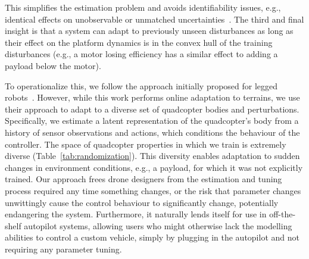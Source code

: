 %
This simplifies the estimation problem and avoids identifiability issues, e.g., identical effects on unobservable or unmatched uncertainties~\cite{hovakimyan2010l1}.
%
%
%
The third and final insight is that a system can adapt to previously unseen disturbances as long as their effect on the platform dynamics is in the convex hull of the training disturbances (e.g., a motor losing efficiency has a similar effect to adding a payload below the motor).

To operationalize this, we follow the approach initially proposed for legged robots~\cite{kumar2021rma}. However, while this work performs online adaptation to terrains, we use their approach to adapt to a diverse set of quadcopter bodies and perturbations. Specifically, we estimate a latent representation of the quadcopter's body from a history of sensor observations and actions, which conditions the behaviour of the controller.
%
The space of quadcopter properties in which we train is extremely diverse (Table~\ref{tab:randomization}).
%
%
This diversity enables adaptation to sudden changes in environment conditions, e.g., a payload, for which it was not explicitly trained.
%
Our approach frees drone designers from the estimation and tuning process required any time something changes, or the risk that parameter changes unwittingly cause the control behaviour to significantly change, potentially endangering the system.
%
Furthermore, it naturally lends itself for use in off-the-shelf autopilot systems, allowing users who might otherwise lack the modelling abilities to control a custom vehicle, simply by plugging in the autopilot and not requiring any parameter tuning.

